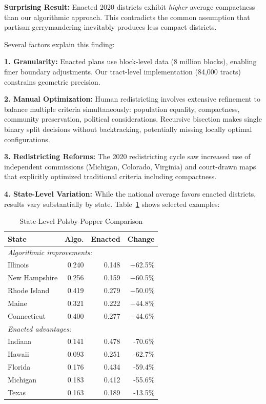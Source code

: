 \textbf{Surprising Result:} Enacted 2020 districts exhibit \textit{higher} average compactness than our algorithmic approach. This contradicts the common assumption that partisan gerrymandering inevitably produces less compact districts.

Several factors explain this finding:

\textbf{1. Granularity:} Enacted plans use block-level data (8 million blocks), enabling finer boundary adjustments. Our tract-level implementation (84,000 tracts) constrains geometric precision.

\textbf{2. Manual Optimization:} Human redistricting involves extensive refinement to balance multiple criteria simultaneously: population equality, compactness, community preservation, political considerations. Recursive bisection makes single binary split decisions without backtracking, potentially missing locally optimal configurations.

\textbf{3. Redistricting Reforms:} The 2020 redistricting cycle saw increased use of independent commissions (Michigan, Colorado, Virginia) and court-drawn maps that explicitly optimized traditional criteria including compactness.

\textbf{4. State-Level Variation:} While the national average favors enacted districts, results vary substantially by state. Table~\ref{tab:state_comparison} shows selected examples:

\begin{table}[h]
\centering
\caption{State-Level Polsby-Popper Comparison}
\label{tab:state_comparison}
\small
\begin{tabular}{lrrr}
\toprule
\textbf{State} & \textbf{Algo.} & \textbf{Enacted} & \textbf{Change} \\
\midrule
\multicolumn{4}{l}{\textit{Algorithmic improvements:}} \\
Illinois & 0.240 & 0.148 & +62.5\% \\
New Hampshire & 0.256 & 0.159 & +60.5\% \\
Rhode Island & 0.419 & 0.279 & +50.0\% \\
Maine & 0.321 & 0.222 & +44.8\% \\
Connecticut & 0.400 & 0.277 & +44.6\% \\
\midrule
\multicolumn{4}{l}{\textit{Enacted advantages:}} \\
Indiana & 0.141 & 0.478 & -70.6\% \\
Hawaii & 0.093 & 0.251 & -62.7\% \\
Florida & 0.176 & 0.434 & -59.4\% \\
Michigan & 0.183 & 0.412 & -55.6\% \\
Texas & 0.163 & 0.189 & -13.5\% \\
\bottomrule
\end{tabular}
\end{table}

